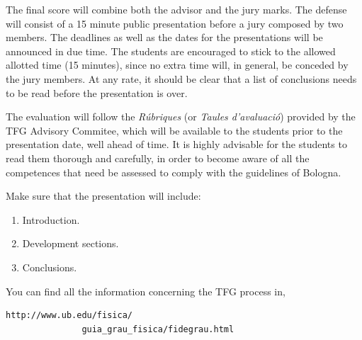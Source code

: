 \documentclass[twocolumn]{revtex4}
\begin{document}
The final score will combine both the
advisor and the jury marks.
The defense will consist of a 15 minute public presentation before
a jury composed by two members. The deadlines as well as the dates for the
presentations will be announced in due time.
The students are encouraged to stick to the allowed allotted time (15 minutes),
since no extra time will, in general, be conceded by the jury members. 
At any rate,
it should be clear that a list of conclusions needs to be read
before the presentation is over.

The evaluation will follow the {\it R\'ubriques} (or {\it Taules
d'avaluaci\'o}) provided by the TFG Advisory Commitee, 
which will be available to 
the students prior to the presentation date, well ahead of time. It is
highly advisable for the students to read them thorough and carefully,
in order to become aware of all the competences that need be assessed
to comply with the guidelines of Bologna.

Make sure that the presentation will include:
\begin{enumerate}
\item Introduction.
\item Development sections.
\item Conclusions.
\end{enumerate}


You can find all the information concerning the TFG process in,
\begin{verbatim}
http://www.ub.edu/fisica/
               guia_grau_fisica/fidegrau.html
\end{verbatim}

\end{document}
